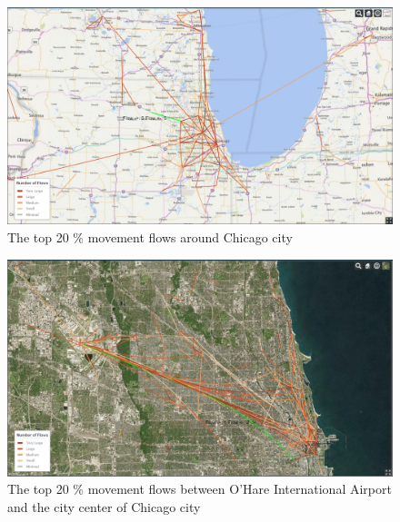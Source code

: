 \documentclass[ijgi,article,submit,moreauthors,pdftex,10pt,a4paper]{mdpi}
\theoremstyle{mdpi}
\newcounter{re}
\theoremstyle{mdpidefinition}
\providecommand{\DIFaddbegin}{} %
\providecommand{\DIFdelbegin}{} %
\providecommand{\DIFdelend}{} %
\providecommand{\DIFaddendFL}{} %
\begin{document}
\DIFdelbegin %
\DIFdelend \DIFaddbegin \begin{figure}[ht]
\DIFaddendFL \centering
\includegraphics[width=0.8\linewidth]{./figures/Chicago}
\caption{The top 20 $\%$ movement flows around Chicago city}
\label{fig:chicago}
\end{figure}
\FloatBarrier

\DIFdelbegin %
\DIFdelend \DIFaddbegin \begin{figure}[ht]
\DIFaddendFL \centering
\includegraphics[width=0.8\linewidth]{./figures/Chicago_airport}
\caption{The top 20 $\%$ movement flows between O'Hare International Airport and the city center of Chicago city}
\label{fig:Chicago_airport}
\end{figure}
\FloatBarrier
\end{document}
